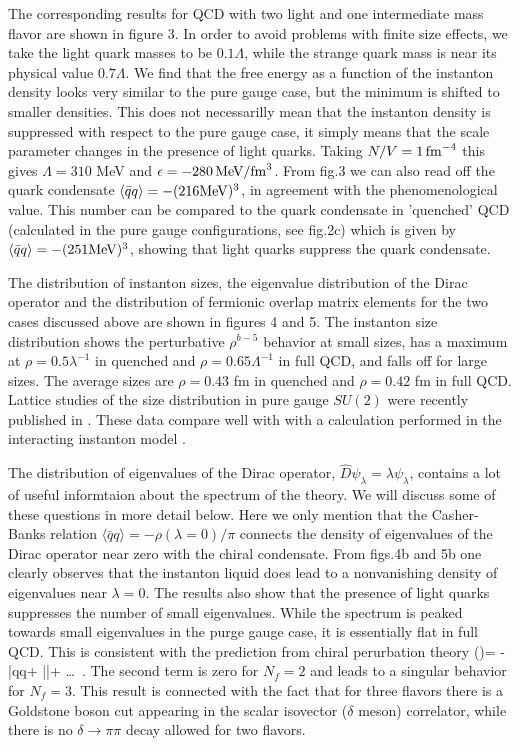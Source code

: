    The corresponding results for QCD with two light and one intermediate
mass flavor are shown in figure 3. In order to avoid problems with
finite size effects, we take the light quark masses to be $0.1\Lambda$,
while the strange quark mass is near its physical value $0.7\Lambda$.
We find that the free energy as a function of the instanton density looks
very similar to the pure gauge case, but the minimum is shifted to
smaller densities. This does not necessarilly mean that the instanton
density is suppressed with respect to the pure gauge case, it simply
means that the scale parameter changes in the presence of light quarks.
Taking $N/V=1\,{\rm fm}^{-4}$ this gives $\Lambda = 310$ MeV and
$\epsilon=-280\,{\rm MeV}/{\rm fm}^3$. From fig.3 we can also read
off the quark condensate $\langle\bar qq\rangle=-(216 {\rm MeV})^3$,
in agreement with the phenomenological value. This number can be
compared to the quark condensate in 'quenched' QCD (calculated in
the pure gauge configurations, see fig.2c) which is given by
$\langle\bar qq\rangle=-(251 {\rm MeV})^3$, showing that light
quarks suppress the quark condensate.

    The distribution of instanton sizes, the eigenvalue distribution
of the Dirac operator and the distribution of fermionic overlap
matrix elements for the two cases discussed above are shown in
figures 4 and 5. The instanton size distribution shows the perturbative
$\rho^{b-5}$ behavior at small sizes, has a maximum at $\rho=0.5
\lambda^{-1}$ in quenched and $\rho=0.65\Lambda^{-1}$ in full
QCD, and falls off for large sizes. The average sizes are $\rho
=0.43$ fm in quenched and $\rho=0.42$ fm in full QCD. Lattice studies
of the size distribution in pure gauge $SU(2)$ were recently published
in \cite{MS_95}. These data compare well with with a calculation performed
in the interacting instanton model \cite{Shu_95}.

   The distribution of eigenvalues of the Dirac operator, $\hat D
\psi_\lambda=\lambda\psi_\lambda$, contains a lot of useful informtaion
about the spectrum of the theory. We will discuss some of these questions
in more detail below. Here we only mention that the Casher-Banks relation
$\langle\bar qq\rangle=-\rho(\lambda=0)/\pi$ connects the density of
eigenvalues of the Dirac operator near zero with the chiral condensate.
From figs.4b and 5b one clearly observes that the instanton liquid
does lead to a nonvanishing density of eigenvalues near $\lambda=0$.
The results also show that the presence of light quarks suppresses
the number of small eigenvalues. While the spectrum is peaked towards
small eigenvalues in the purge gauge case, it is essentially flat
in full QCD. This is consistent with the prediction from chiral
perurbation theory \cite{SS_93}
\be
\rho(\lambda)= -\pi \langle\bar qq\rangle +
    |\lambda|+ \ldots \, .
\ee
The second term is zero for $N_f=2$ and leads to a singular behavior
for $N_f=3$. This result is connected with the fact that for three
flavors there is a Goldstone boson cut appearing in the scalar
isovector ($\delta$ meson) correlator, while there is no $\delta
\to \pi\pi$ decay allowed for two flavors.

